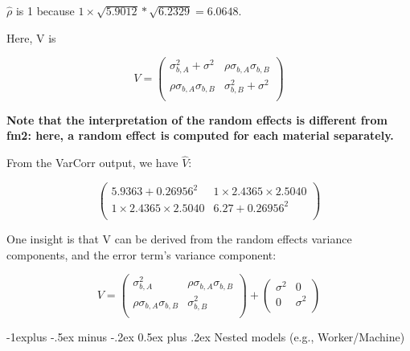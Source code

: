 \documentclass[10pt,landscape]{article}
\makeatletter
\renewcommand{\subsection}{\@startsection{subsection}{2}{0mm}%
                                {-1explus -.5ex minus -.2ex}%
                                {0.5ex plus .2ex}%
                                {\normalfont\normalsize\bfseries}}
\makeatother
\begin{document}
\begin{multicols}{3}
$\hat{\rho}$ is 1 because $1\times 
\sqrt{5.9012}*\sqrt{6.2329}=6.0648$.


Here, V is

\begin{equation}
V =
\begin{pmatrix}
\sigma^2_{b,A} + \sigma^2  &  \rho\sigma_{b,A}\sigma_{b,B}\\
\rho\sigma_{b,A}\sigma_{b,B} & \sigma^2_{b,B}+\sigma^2  \\       
\end{pmatrix}
\end{equation}

\textbf{Note that the interpretation of the random effects is different from fm2: here, a random effect is computed for each material separately.}


From the VarCorr output, we have $\hat{V}$:

\begin{equation}
\begin{pmatrix}
5.9363 + 0.26956^2  &  1 \times 2.4365\times 2.5040 \\
1 \times 2.4365\times 2.5040 & 6.27+0.26956^2  \\       
\end{pmatrix}
\end{equation}


One insight is that V can be derived from the random effects variance components, and the error term's variance component:

\begin{equation}
V=
\begin{pmatrix}
\sigma^2_{b,A} &\rho\sigma_{b,A}\sigma_{b,B}\\
\rho\sigma_{b,A}\sigma_{b,B} & \sigma^2_{b,B}\\
\end{pmatrix}
+
\begin{pmatrix}
\sigma^2 & 0\\
0 & \sigma^2\\
\end{pmatrix}
\end{equation}

\subsection{Nested models (e.g., Worker/Machine)}


\end{multicols}
\end{document}
